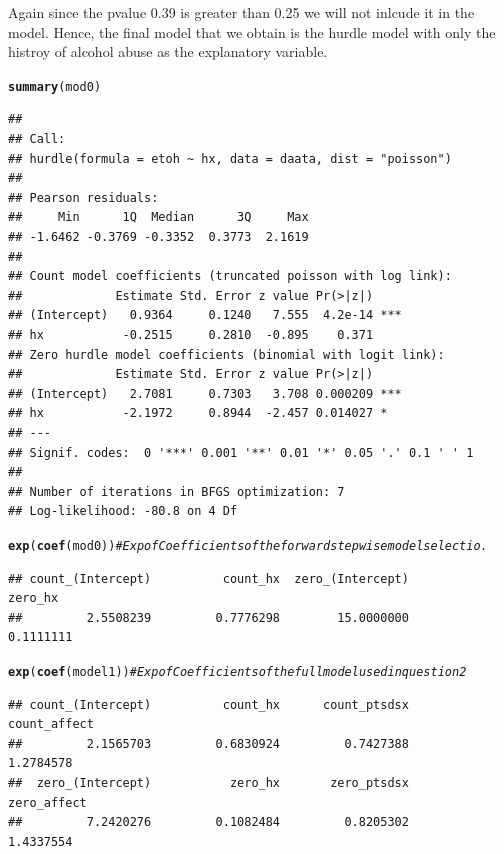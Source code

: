 \documentclass{article}\usepackage[]{graphicx}\usepackage[]{color}
\makeatletter
\newcommand{\hlcom}[1]{\textcolor[rgb]{0.678,0.584,0.686}{\textit{#1}}}%
\newcommand{\hlstd}[1]{\textcolor[rgb]{0.345,0.345,0.345}{#1}}%
\newcommand{\hlkwd}[1]{\textcolor[rgb]{0.737,0.353,0.396}{\textbf{#1}}}%
\newenvironment{kframe}{%
 \def\at@end@of@kframe{}%
 \ifinner\ifhmode%
  \def\at@end@of@kframe{\end{minipage}}%
  \begin{minipage}{\columnwidth}%
 \fi\fi%
 \def\FrameCommand##1{\hskip\@totalleftmargin \hskip-\fboxsep
 \colorbox{shadecolor}{##1}\hskip-\fboxsep
     \hskip-\linewidth \hskip-\@totalleftmargin \hskip\columnwidth}%
 \MakeFramed {\advance\hsize-\width
   \@totalleftmargin\z@ \linewidth\hsize
   \@setminipage}}%
 {\par\unskip\endMakeFramed%
 \at@end@of@kframe}
\newenvironment{knitrout}{}{} %
\makeatother
\begin{document}
Again since the pvalue 0.39 is greater than 0.25 we will not inlcude it in the model. Hence, the final model that we obtain is the hurdle model with only the histroy of alcohol abuse as the explanatory variable. 


\begin{knitrout}
\color{fgcolor}\begin{kframe}
\begin{alltt}
\hlkwd{summary}\hlstd{(mod0)}
\end{alltt}
\begin{verbatim}
## 
## Call:
## hurdle(formula = etoh ~ hx, data = daata, dist = "poisson")
## 
## Pearson residuals:
##     Min      1Q  Median      3Q     Max 
## -1.6462 -0.3769 -0.3352  0.3773  2.1619 
## 
## Count model coefficients (truncated poisson with log link):
##             Estimate Std. Error z value Pr(>|z|)    
## (Intercept)   0.9364     0.1240   7.555  4.2e-14 ***
## hx           -0.2515     0.2810  -0.895    0.371    
## Zero hurdle model coefficients (binomial with logit link):
##             Estimate Std. Error z value Pr(>|z|)    
## (Intercept)   2.7081     0.7303   3.708 0.000209 ***
## hx           -2.1972     0.8944  -2.457 0.014027 *  
## ---
## Signif. codes:  0 '***' 0.001 '**' 0.01 '*' 0.05 '.' 0.1 ' ' 1 
## 
## Number of iterations in BFGS optimization: 7 
## Log-likelihood: -80.8 on 4 Df
\end{verbatim}
\begin{alltt}
\hlkwd{exp}\hlstd{(}\hlkwd{coef}\hlstd{(mod0))}  \hlcom{# Exp of Coefficients of the forward stepwise model selectio. }
\end{alltt}
\begin{verbatim}
## count_(Intercept)          count_hx  zero_(Intercept)           zero_hx 
##         2.5508239         0.7776298        15.0000000         0.1111111
\end{verbatim}
\begin{alltt}
\hlkwd{exp}\hlstd{(}\hlkwd{coef}\hlstd{(model1))}  \hlcom{# Exp of Coefficients of the full model used in question 2}
\end{alltt}
\begin{verbatim}
## count_(Intercept)          count_hx      count_ptsdsx      count_affect 
##         2.1565703         0.6830924         0.7427388         1.2784578 
##  zero_(Intercept)           zero_hx       zero_ptsdsx       zero_affect 
##         7.2420276         0.1082484         0.8205302         1.4337554
\end{verbatim}
\end{kframe}
\end{knitrout}
\end{document}
